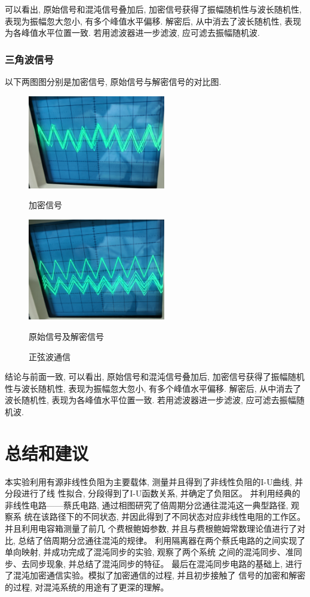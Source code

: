 \documentclass[12pt,a4paper]{article}
\begin{document}
   

可以看出, 原始信号和混沌信号叠加后, 加密信号获得了振幅随机性与波长随机性, 表现为振幅忽大忽小, 有多个峰值水平偏移. 
解密后, 从中消去了波长随机性, 表现为各峰值水平位置一致. 若用滤波器进一步滤波, 应可滤去振幅随机波. 

\subsubsection{三角波信号}
以下两图图分别是加密信号, 原始信号与解密信号的对比图.
\begin{figure}[H]
  \centering
  \begin{minipage}[t]{0.48\textwidth}
  \centering
  \includegraphics[width=6cm]{tri加密信号.jpg}
  \caption{加密信号}
  \end{minipage}
  \begin{minipage}[t]{0.48\textwidth}
  \centering
  \includegraphics[width=6cm]{tri原始信号与解密信号对比.jpg}
  \caption{原始信号及解密信号}
  \end{minipage}
  \caption{正弦波通信}
  \end{figure}
结论与前面一致, 可以看出, 原始信号和混沌信号叠加后, 加密信号获得了振幅随机性与波长随机性, 表现为振幅忽大忽小, 有多个峰值水平偏移. 
解密后, 从中消去了波长随机性, 表现为各峰值水平位置一致. 若用滤波器进一步滤波, 应可滤去振幅随机波. 
\section{总结和建议}
本实验利用有源非线性负阻为主要载体, 测量并且得到了非线性负阻的I-U曲线, 并分段进行了线
性拟合, 分段得到了I-U函数关系, 并确定了负阻区。
并利用经典的非线性电路——蔡氏电路, 通过相图研究了倍周期分岔通往混沌这一典型路径, 观察系
统在该路径下的不同状态, 并因此得到了不同状态对应非线性电阻的工作区。并且利用电容箱测量了前几
个费根鲍姆参数, 并且与费根鲍姆常数理论值进行了对比, 总结了倍周期分岔通往混沌的规律。
利用隔离器在两个蔡氏电路的之间实现了单向映射, 并成功完成了混沌同步的实验, 观察了两个系统
之间的混沌同步、准同步、去同步现象, 并总结了混沌同步的特征。
最后在混沌同步电路的基础上, 进行了混沌加密通信实验。模拟了加密通信的过程, 并且初步接触了
信号的加密和解密的过程, 对混沌系统的用途有了更深的理解。
\end{document}
